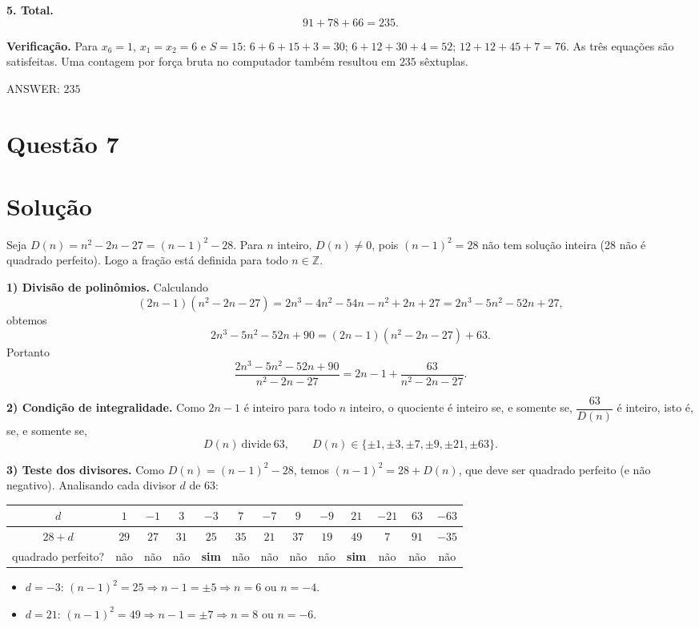 \documentclass{article}%
\begin{document}
\textbf{5. Total.}
\[
91+78+66=235 .
\]

\textbf{Verificação.} Para $x_6=1$, $x_1=x_2=6$ e $S=15$:
$6+6+15+3=30$; $6+12+30+4=52$; $12+12+45+7=76$. As três equações são satisfeitas. Uma contagem por força bruta no computador também resultou em $235$ sêxtuplas.

ANSWER: $235$%
\newpage%
\section*{Questão 7}

\section*{Solução}

Seja $D(n)=n^2-2n-27=(n-1)^2-28$. Para $n$ inteiro, $D(n)\neq 0$, pois $(n-1)^2=28$ não tem solução inteira (28 não é quadrado perfeito). Logo a fração está definida para todo $n\in\mathbb{Z}$.

\textbf{1) Divisão de polinômios.} Calculando
\[
(2n-1)(n^2-2n-27)=2n^3-4n^2-54n-n^2+2n+27=2n^3-5n^2-52n+27,
\]
obtemos
\[
2n^3-5n^2-52n+90=(2n-1)(n^2-2n-27)+63 .
\]
Portanto
\[
\frac{2n^3-5n^2-52n+90}{n^2-2n-27}=2n-1+\frac{63}{n^2-2n-27}.
\]

\textbf{2) Condição de integralidade.} Como $2n-1$ é inteiro para todo $n$ inteiro, o quociente é inteiro se, e somente se, $\dfrac{63}{D(n)}$ é inteiro, isto é, se, e somente se,
\[
D(n)\ \text{divide}\ 63,\qquad D(n)\in\{\pm1,\pm3,\pm7,\pm9,\pm21,\pm63\}.
\]

\textbf{3) Teste dos divisores.} Como $D(n)=(n-1)^2-28$, temos $(n-1)^2=28+D(n)$, que deve ser quadrado perfeito (e não negativo). Analisando cada divisor $d$ de $63$:

\begin{center}
\begin{tabular}{c|cccccccccccc}
$d$ & $1$ & $-1$ & $3$ & $-3$ & $7$ & $-7$ & $9$ & $-9$ & $21$ & $-21$ & $63$ & $-63$\\ \hline
$28+d$ & $29$ & $27$ & $31$ & $25$ & $35$ & $21$ & $37$ & $19$ & $49$ & $7$ & $91$ & $-35$\\
quadrado perfeito? & não & não & não & \textbf{sim} & não & não & não & não & \textbf{sim} & não & não & não
\end{tabular}
\end{center}

\begin{itemize}
\item $d=-3$: $(n-1)^2=25\Rightarrow n-1=\pm5\Rightarrow n=6$ ou $n=-4$.
\item $d=21$: $(n-1)^2=49\Rightarrow n-1=\pm7\Rightarrow n=8$ ou $n=-6$.
\end{itemize}
\end{document}
